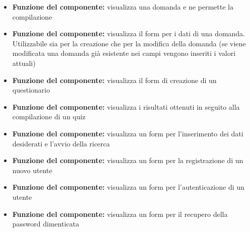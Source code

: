 			\begin{itemize}
				\item\textbf{Funzione del componente:} visualizza una domanda e ne permette la compilazione
			\end{itemize}
			\begin{itemize}
				\item\textbf{Funzione del componente:} visualizza il form per i dati di una domanda. Utilizzabile sia per la creazione che per la modifica della domanda (se viene modificata una domanda già esistente nei campi vengono inseriti i valori attuali)
			\end{itemize}
			\begin{itemize}
				\item\textbf{Funzione del componente:} visualizza il form di creazione di un questionario
			\end{itemize}
			\begin{itemize}
				\item\textbf{Funzione del componente:} visualizza i risultati ottenuti in seguito alla compilazione di un quiz
			\end{itemize}
			\begin{itemize}
				\item\textbf{Funzione del componente:} visualizza un form per l'inserimento dei dati desiderati e l'avvio della ricerca
			\end{itemize}
			\begin{itemize}
				\item\textbf{Funzione del componente:} visualizza un form per la registrazione di un nuovo utente
			\end{itemize}
			\begin{itemize}
				\item\textbf{Funzione del componente:} visualizza un form per l'autenticazione di un utente
			\end{itemize}
			\begin{itemize}
				\item\textbf{Funzione del componente:} visualizza un form per il recupero della password dimenticata
			\end{itemize}
			
			\newpage